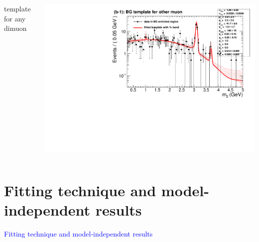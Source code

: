 \documentclass[compress]{beamer}
\begin{document}
\begin{frame}
\begin{columns}
\centering template for any dimuon

\includegraphics[width=\linewidth]{template__bg_sh_b1o__m_2_log.pdf}
\end{columns}
\end{frame}

\section*{Fitting technique and model-independent results}
\begin{frame}
\begin{center}
\Huge \textcolor{blue}{Fitting technique and model-independent results}
\end{center}
\end{frame}
\end{document}
